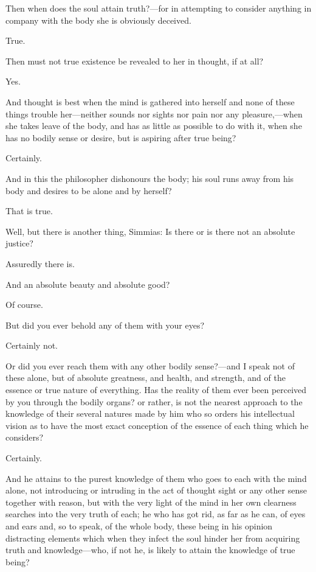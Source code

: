 Then when does the soul attain truth?—for in attempting to consider
anything in company with the body she is obviously deceived.

True.

Then must not true existence be revealed to her in thought, if at all?

Yes.

And thought is best when the mind is gathered into herself and none of
these things trouble her—neither sounds nor sights nor pain nor any
pleasure,—when she takes leave of the body, and has as little as
possible to do with it, when she has no bodily sense or desire, but is
aspiring after true being?

Certainly.

And in this the philosopher dishonours the body; his soul runs away from
his body and desires to be alone and by herself?

That is true.

Well, but there is another thing, Simmias: Is there or is there not an
absolute justice?

Assuredly there is.

And an absolute beauty and absolute good?

Of course.

But did you ever behold any of them with your eyes?

Certainly not.

Or did you ever reach them with any other bodily sense?—and I speak
not of these alone, but of absolute greatness, and health, and strength,
and of the essence or true nature of everything. Has the reality of them
ever been perceived by you through the bodily organs? or rather, is not
the nearest approach to the knowledge of their several natures made by him
who so orders his intellectual vision as to have the most exact conception
of the essence of each thing which he considers?

Certainly.

And he attains to the purest knowledge of them who goes to each with the
mind alone, not introducing or intruding in the act of thought sight or
any other sense together with reason, but with the very light of the mind
in her own clearness searches into the very truth of each; he who has got
rid, as far as he can, of eyes and ears and, so to speak, of the whole
body, these being in his opinion distracting elements which when they
infect the soul hinder her from acquiring truth and knowledge—who,
if not he, is likely to attain the knowledge of true being?

